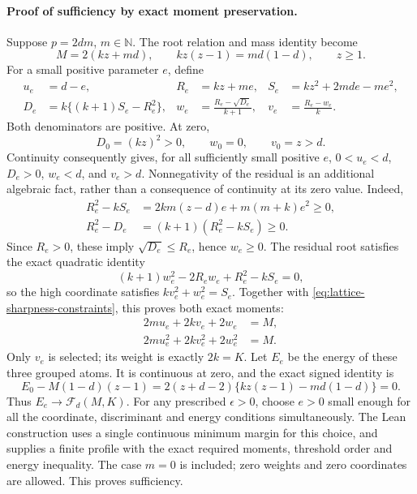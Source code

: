 \paragraph{Proof of sufficiency by exact moment preservation.}
Suppose \(p=2dm\), \(m\in\mathbb N\).  The root relation and mass identity
become
\begin{equation}
 M=2(kz+md),\qquad kz(z-1)=md(1-d),\qquad z\ge1.
 \label{eq:lattice-sharpness-constraints}
\end{equation}
For a small positive parameter \(e\), define
\begin{align*}
 u_e&=d-e,& R_e&=kz+me,& S_e&=kz^2+2mde-me^2,\\
 D_e&=k\{(k+1)S_e-R_e^2\},&
 w_e&=\frac{R_e-\sqrt{D_e}}{k+1},&
 v_e&=\frac{R_e-w_e}{k}.
\end{align*}
Both denominators are positive.  At zero,
\[
 D_0=(kz)^2>0,\qquad w_0=0,\qquad v_0=z>d.
\]
Continuity consequently gives, for all sufficiently small positive \(e\),
\(0<u_e<d\), \(D_e>0\), \(w_e<d\), and \(v_e>d\).
Nonnegativity of the residual is an additional algebraic fact, rather than
a consequence of continuity at its zero value.  Indeed,
\begin{align*}
 R_e^2-kS_e&=2km(z-d)e+m(m+k)e^2\ge0,\\
 R_e^2-D_e&=(k+1)(R_e^2-kS_e)\ge0.
\end{align*}
Since \(R_e>0\), these imply \(\sqrt{D_e}\le R_e\), hence \(w_e\ge0\).
The residual root satisfies the exact quadratic identity
\[
 (k+1)w_e^2-2R_ew_e+R_e^2-kS_e=0,
\]
so the high coordinate satisfies \(kv_e^2+w_e^2=S_e\).  Together with
\eqref{eq:lattice-sharpness-constraints}, this proves both exact moments:
\begin{align*}
 2mu_e+2kv_e+2w_e&=M,\\
 2mu_e^2+2kv_e^2+2w_e^2&=M.
\end{align*}
Only \(v_e\) is selected; its weight is exactly \(2k=K\).
Let \(E_e\) be the energy of these three grouped atoms.  It is continuous
at zero, and the exact signed identity is
\[
 E_0-M(1-d)(z-1)
 =2(z+d-2)\{kz(z-1)-md(1-d)\}=0.
\]
Thus \(E_e\to\mathcal F_d(M,K)\).  For any prescribed \(\epsilon>0\),
choose \(e>0\) small enough for all the coordinate, discriminant and
energy conditions simultaneously.  The Lean construction uses a single
continuous minimum margin for this choice, and supplies a finite profile
with the exact required moments, threshold order and energy inequality.
The case \(m=0\) is included; zero weights and zero coordinates are allowed.
This proves sufficiency.

